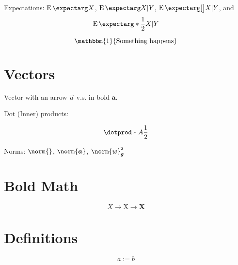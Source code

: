 \documentclass{article}
\begin{document}
Expectations: $\E{X}$, $\E{X|Y}$, $\E[\big]{X|Y}$, and
\[
\E*{\frac{1}{2} X | Y}
\]

\newcommand*{\Ind}[1]{\mathbbm{1}\{#1\}}

\[
\Ind{\text{Something happens}}
\]

\section{Vectors}

\let\arrvec\vec
\renewcommand*{\vec}{\bm}

Vector with an arrow $\arrvec{a}$ v.s. in bold $\vec{a}$.

Dot (Inner) products:

\DeclarePairedDelimiterX{}

\[
\dotprod*{A}{\frac{1}{2}}
\]

\DeclarePairedDelimiterX\norm[1]\lVert{}

Norms: $\norm{}$, $\norm{\vec{a}}$, $\norm{w}_{\vec{g}}^2$

\section{Bold Math}

{\boldmath
$$ X \rightarrow \mathrm{X} \rightarrow \mathbf{X} $$
}

\section{Definitions}
\[
a := b
\]

\appendix


%
%
\end{document}

